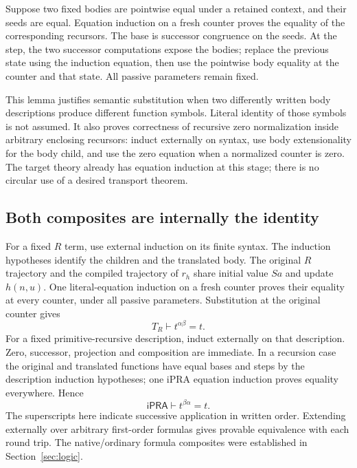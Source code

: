 \documentclass[11pt,letterpaper]{article}
\theoremstyle{definition}
\newcommand{\ipra}{\mathsf{iPRA}}
\newcommand{\TR}{T_R}
\begin{document}
Suppose two fixed bodies are pointwise equal under a retained context,
and their seeds are equal. Equation induction on a fresh counter
proves the equality of the corresponding recursors. The base is
successor congruence on the seeds. At the step, the two successor
computations expose the bodies; replace the previous state using
the induction equation, then use the pointwise body equality at
the counter and that state. All passive parameters remain fixed.

This lemma justifies semantic substitution when two differently
written body descriptions produce different function symbols. Literal
identity of those symbols is not assumed. It also proves correctness
of recursive zero normalization inside arbitrary enclosing recursors:
induct externally on syntax, use body extensionality for the body
child, and use the zero equation when a normalized counter is zero.
The target theory already has equation induction at this stage;
there is no circular use of a desired transport theorem.

\subsection{Both composites are internally the identity}

For a fixed $R$ term, use external induction on its finite syntax.
The induction hypotheses identify the children and the translated
body. The original $R$ trajectory and the compiled trajectory of
$r_h$ share initial value $Sa$ and update $h(n,u)$.
One literal-equation induction on a fresh counter proves their
equality at every counter, under all passive parameters. Substitution
at the original counter gives
\[
                         \TR\vdash t^{\alpha\beta}=t.
\]
For a fixed primitive-recursive description, induct externally on
that description. Zero, successor, projection and composition are
immediate. In a recursion case the original and translated functions
have equal bases and steps by the description induction hypotheses;
one iPRA equation induction proves equality everywhere. Hence
\[
                         \ipra\vdash t^{\beta\alpha}=t.
\]
The superscripts here indicate successive application in written
order. Extending externally over arbitrary first-order formulas gives
provable equivalence with each round trip. The native/ordinary
formula composites were established in Section~\ref{sec:logic}.
\end{document}
